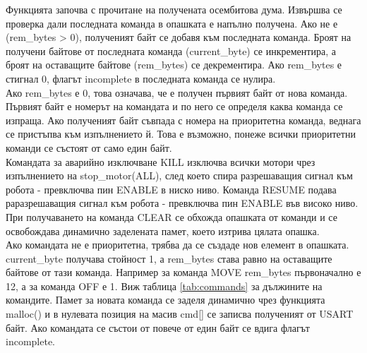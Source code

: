 Функцията започва с прочитане на получената осембитова дума. Извършва се проверка дали последната команда в опашката е напълно получена. Ако не е (rem\_bytes > 0), полученият байт се добавя към последната команда. Броят на получени байтове от последната команда (current\_byte) се инкрементира, а броят на оставащите байтове (rem\_bytes) се декрементира. Ако rem\_bytes е стигнал 0, флагът incomplete в последната команда се нулира.\\
\indent{}
Ако rem\_bytes е 0, това означава, че е получен първият байт от нова команда. Първият байт е номерът на командата и по него се определя каква команда се изпраща. Ако полученият байт съвпада с номера на приоритетна команда, веднага се пристъпва към изпълнението й. Това е възможно, понеже всички приоритетни команди се състоят от само един байт.\\
\indent{}
Командата за аварийно изключване KILL изключва всички мотори чрез изпълнението на stop\_motor(ALL), след което спира разрешаващия сигнал към робота - превключва пин ENABLE в ниско ниво. Команда RESUME подава раразрешаващия сигнал към робота - превключва пин ENABLE във високо ниво. При получаването на команда CLEAR се обхожда опашката от команди и се освобождава динамично заделената памет, което изтрива цялата опашка.\\
\indent{}
Ако командата не е приоритетна, трябва да се създаде нов елемент в опашката. current\_byte получава стойност 1, а rem\_bytes става равно на оставащите байтове от тази команда. Например за команда MOVE rem\_bytes първоначално е 12, а за команда OFF е 1. Виж таблица \ref{tab:commands} за дължините на командите. Памет за новата команда се заделя динамично чрез функцията malloc() и в нулевата позиция на масив cmd[] се записва полученият от USART байт. Ако командата се състои от повече от един байт се вдига флагът incomplete.
